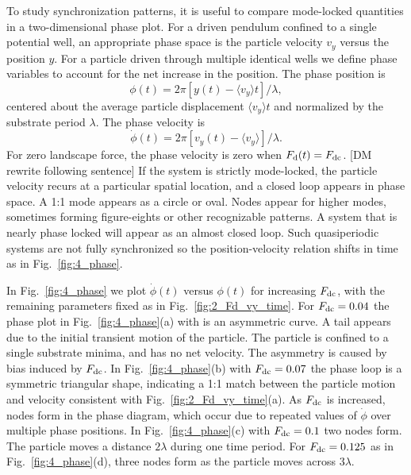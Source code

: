 \documentclass[preprint,showpacs,preprintnumbers,amsmath,amssymb,aps,prb]{revtex4-1}
\theoremstyle{remark}
\begin{document}
  To study synchronization patterns, 
  it is useful to compare
  mode-locked quantities 
  in a two-dimensional phase plot. 
  For a driven pendulum confined to a single potential well,
  an appropriate
  phase space is the particle velocity $v_y$ versus the position $y$.  
  For a particle driven 
  through multiple identical wells 
  we define phase variables 
  to account for the net increase in the position.
  The phase position is
  \begin{equation}
    \phi(t) = 2\pi [y(t)-\langle v_y \rangle t]/\lambda,
  \end{equation}
  centered about the average particle displacement $\langle v_y \rangle t$
  and normalized by the substrate period $\lambda$.\cite{Juniper2015}
  The phase velocity is
  \begin{equation}
    \dot{\phi}(t) =2\pi [v_y(t)-\langle v_y \rangle] /\lambda.  
  \end{equation}
  For zero landscape force, 
  the phase velocity  is zero when $F_{\rm d}(t) = F_{\rm dc}$.
  [DM rewrite following sentence]
  If the system
  is strictly mode-locked,
  the particle velocity
  recurs at a particular spatial location, and 
  a closed loop appears in  
  phase space. 
  A 1:1 mode appears as a circle or oval. 
  Nodes appear 
  for higher modes,
  sometimes forming figure-eights
  or other recognizable patterns.
  A system that is nearly phase locked
  will appear as an almost closed loop.
  Such quasiperiodic systems are
  not fully synchronized
  so the position-velocity relation
  shifts in time as in Fig.~\ref{fig:4_phase}.
  
  In Fig.~\ref{fig:4_phase}
  we plot $\dot{\phi}(t)$ versus $\phi(t)$
  for increasing 
  $F_{\rm dc}$, 
  with the remaining parameters fixed as in Fig.~\ref{fig:2_Fd_vy_time}.
  For
  $F_{\rm dc} = 0.04$
  the phase plot   in Fig.~\ref{fig:4_phase}(a) with is an
  asymmetric curve.
  A tail appears
  due to the initial transient
  motion of the particle.
  The particle is confined to a single
  substrate minima,
  and has no net velocity.
  The asymmetry is caused by bias induced by $F_{\rm dc}$.
  In Fig.~\ref{fig:4_phase}(b)
  with $F_{\rm dc} = 0.07$
  the phase loop is a symmetric triangular shape,
  indicating a 1:1 match between the
  particle motion and velocity consistent with 
  Fig.~\ref{fig:2_Fd_vy_time}(a).
  As $F_{\rm dc}$ is
  increased,
  nodes form in the phase diagram, which
   occur due to repeated values
  of $\dot{\phi}$ over multiple phase positions.
  In Fig.~\ref{fig:4_phase}(c)
  with $F_{\rm dc} = 0.1$
  two nodes form.
  The particle moves a distance $2\lambda$
  during one time period.
For $F_{\rm dc} = 0.125$ as in Fig.~\ref{fig:4_phase}(d),
  three nodes form as the particle moves across $3\lambda$.
  
\end{document}
